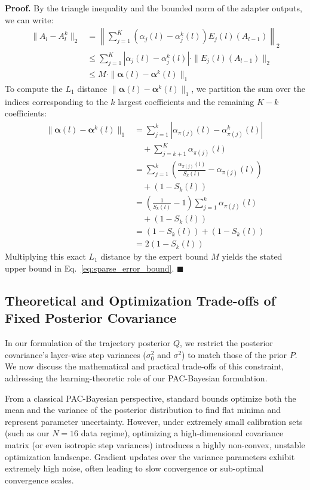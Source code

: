 \textbf{Proof.} By the triangle inequality and the bounded norm of the adapter outputs, we can write:
\begin{align}
\|A_l - A^k_l\|_2 &= \left\| \sum_{j=1}^K \left( \alpha_j(l) - \alpha^k_j(l) \right) E_j(l)(A_{l-1}) \right\|_2 \nonumber \\
&\le \sum_{j=1}^K |\alpha_j(l) - \alpha^k_j(l)| \cdot \|E_j(l)(A_{l-1})\|_2 \nonumber \\
&\le M \cdot \|\boldsymbol{\alpha}(l) - \boldsymbol{\alpha}^k(l)\|_1
\end{align}
To compute the $L_1$ distance $\|\boldsymbol{\alpha}(l) - \boldsymbol{\alpha}^k(l)\|_1$, we partition the sum over the indices corresponding to the $k$ largest coefficients and the remaining $K-k$ coefficients:
\begin{align}
\|\boldsymbol{\alpha}(l) - \boldsymbol{\alpha}^k(l)\|_1 &= \sum_{j=1}^k |\alpha_{\pi(j)}(l) - \alpha^k_{\pi(j)}(l)| \nonumber \\
&\quad + \sum_{j=k+1}^K \alpha_{\pi(j)}(l) \nonumber \\
&= \sum_{j=1}^k \left( \frac{\alpha_{\pi(j)}(l)}{S_k(l)} - \alpha_{\pi(j)}(l) \right) \nonumber \\
&\quad + (1 - S_k(l)) \nonumber \\
&= \left( \frac{1}{S_k(l)} - 1 \right) \sum_{j=1}^k \alpha_{\pi(j)}(l) \nonumber \\
&\quad + (1 - S_k(l)) \nonumber \\
&= (1 - S_k(l)) + (1 - S_k(l)) \nonumber \\
&= 2 (1 - S_k(l))
\end{align}
Multiplying this exact $L_1$ distance by the expert bound $M$ yields the stated upper bound in Eq.~\ref{eq:sparse_error_bound}. $\blacksquare$

\subsection{Theoretical and Optimization Trade-offs of Fixed Posterior Covariance}
\label{subsec:posterior_covariance}
In our formulation of the trajectory posterior $Q$, we restrict the posterior covariance's layer-wise step variances ($\sigma_0^2$ and $\sigma^2$) to match those of the prior $P$. We now discuss the mathematical and practical trade-offs of this constraint, addressing the learning-theoretic role of our PAC-Bayesian formulation.

From a classical PAC-Bayesian perspective, standard bounds optimize both the mean and the variance of the posterior distribution to find flat minima and represent parameter uncertainty. However, under extremely small calibration sets (such as our $N=16$ data regime), optimizing a high-dimensional covariance matrix (or even isotropic step variances) introduces a highly non-convex, unstable optimization landscape. Gradient updates over the variance parameters exhibit extremely high noise, often leading to slow convergence or sub-optimal convergence scales.

